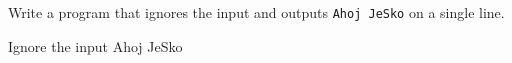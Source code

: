




Write a program that ignores the input and outputs \texttt{Ahoj JeSko} on a single line.

\vstup
Ignore the input
\vystup
Ahoj JeSko
\koniec

